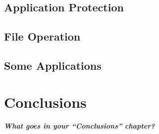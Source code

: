 \documentclass{swfcthesis}
\begin{document}
\section{Application Protection}

\section{File Operation}

\section{Some Applications}

\chapter{Conclusions}%


\paragraph{What goes in your ``Conclusions'' chapter?}
\end{document}
